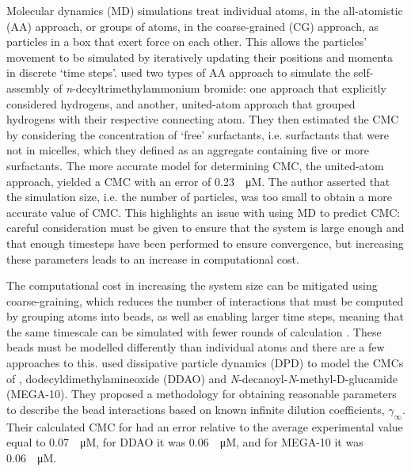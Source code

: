 Molecular dynamics (MD) simulations treat individual atoms, in the all-atomistic
(AA) approach, or groups of atoms, in the coarse-grained (CG) approach, as
particles in a box that exert force on each other. This allows the particles'
movement to be simulated by iteratively updating their positions and momenta in
discrete `time steps'. \citet{jorgeMolecularDynamicsSimulation2008} used two
types of AA approach to simulate the self-assembly of
\textit{n}-decyltrimethylammonium bromide: one approach that explicitly
considered hydrogens, and another, united-atom approach that grouped hydrogens
with their respective connecting atom. They then estimated the CMC by
considering the concentration of `free' surfactants, i.e. surfactants that were
not in micelles, which they defined as an aggregate containing five or more
surfactants. The more accurate model for determining CMC, the united-atom
approach, yielded a CMC with an error of \SI{0.23}{\log \micro M}. The author
asserted that the simulation size, i.e. the number of particles, was too small
to obtain a more accurate value of CMC. This highlights an issue with using MD
to predict CMC: careful consideration must be given to ensure that the system is
large enough and that enough timesteps have been performed to ensure
convergence, but increasing these parameters leads to an increase in
computational cost.

The computational cost in increasing the system size can be mitigated using
coarse-graining, which reduces the number of interactions that must be computed
by grouping atoms into beads, as well as enabling larger time steps, meaning
that the same timescale can be simulated with fewer rounds of calculation
\cite{fitzgeraldMultiscaleModelingNanomaterials2015}. These beads must be
modelled differently than individual atoms and there are a few approaches to
this. \citet{vishnyakovPredictionCriticalMicelle2013} used dissipative particle
dynamics (DPD) to model the CMCs of , dodecyldimethylamineoxide (DDAO)
and \textit{N}-decanoyl-\textit{N}-methyl-\textsc{D}-glucamide (MEGA-10). They
proposed a methodology for obtaining reasonable parameters to describe the bead
interactions based on known infinite dilution coefficients, $\gamma_\infty$.
Their calculated CMC for  had an error relative to the average
experimental value equal to \SI{0.07}{\log \micro M}, for DDAO it was
\SI{0.06}{\log \micro M}, and for MEGA-10 it was \SI{0.06}{\log \micro M}.

